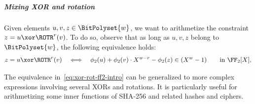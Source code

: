 \subparagraph{Mixing XOR and rotation}
Given elements $u,v,z\in\BitPolyset{w}$, we want to arithmetize the constraint
\( z=u\xor \ROTR^{r}(v)\). To do so, observe that as long as $u,v, z$ belong to $\BitPolyset{w}$, the following equivalence holds:
%
\begin{equation}
\label{eq:xor-rot-ff2-intro}
  z=u\xor \ROTR^{r}(v) \quad \Longleftrightarrow \quad \phi_2(u) + \phi_2(v)\cdot X^{w-r} - \phi_2(z) \in (X^w-1) \qquad \text{in } \FF_2[X],
\end{equation}
%
%

The equivalence in~\eqref{eq:xor-rot-ff2-intro} can be generalized to more complex expressions involving several XORs and rotations. It is particularly useful for arithmetizing some inner functions of SHA-256 and related hashes and ciphers.


